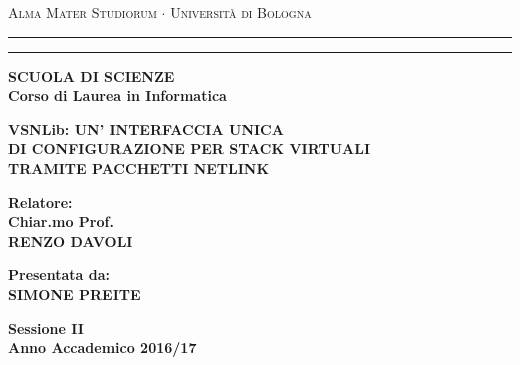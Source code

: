 \begin{titlepage}
\begin{center}
{{\Large{\textsc{Alma Mater Studiorum $\cdot$ Universit\`a di
Bologna}}}} \rule[0.1cm]{13.8cm}{0.1mm}
\rule[0.5cm]{13.8cm}{0.6mm}
{\bf SCUOLA DI SCIENZE\\
Corso di Laurea in Informatica }
\end{center}
\vspace{25mm}
\begin{center}
  {\large{\bf VSNLib: UN' INTERFACCIA UNICA}}\\
  \vspace{2mm}
  {\large{\bf DI CONFIGURAZIONE PER STACK VIRTUALI}}\\
  \vspace{2mm}
  {\large{\bf TRAMITE PACCHETTI NETLINK}}\\
  \end{center}
  \vspace{30mm}
  \par
  \noindent
  \begin{minipage}[t]{0.5\textwidth}
  {\large{\bf Relatore:\\
  Chiar.mo Prof.\\
  RENZO DAVOLI}}\\
  \end{minipage}
  \hfill
  \begin{minipage}[t]{0.5\textwidth}\raggedleft
  {\large{\bf Presentata da:\\
  SIMONE PREITE}}
\end{minipage}
\vspace{30mm}
\begin{center}
{\large{\bf Sessione II\\%
Anno Accademico 2016/17}}%
\end{center}
\end{titlepage}
